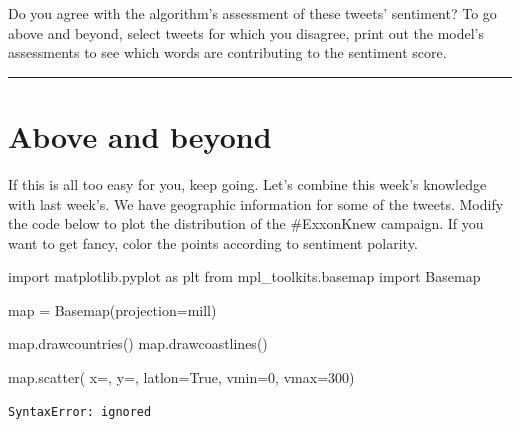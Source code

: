 \documentclass[
  letterpaper,
  DIV=11,
  numbers=noendperiod]{scrreprt}
\newenvironment{Shaded}{\begin{snugshade}}{\end{snugshade}}
\newcommand{\BuiltInTok}[1]{\textcolor[rgb]{0.00,0.23,0.31}{#1}}
\newcommand{\DecValTok}[1]{\textcolor[rgb]{0.68,0.00,0.00}{#1}}
\newcommand{\ImportTok}[1]{\textcolor[rgb]{0.00,0.46,0.62}{#1}}
\newcommand{\NormalTok}[1]{\textcolor[rgb]{0.00,0.23,0.31}{#1}}
\newcommand{\OperatorTok}[1]{\textcolor[rgb]{0.37,0.37,0.37}{#1}}
\newcommand{\StringTok}[1]{\textcolor[rgb]{0.13,0.47,0.30}{#1}}
\newcommand{\VariableTok}[1]{\textcolor[rgb]{0.07,0.07,0.07}{#1}}
\begin{document}
Do you agree with the algorithm's assessment of these tweets' sentiment?
To go above and beyond, select tweets for which you disagree, print out
the model's assessments to see which words are contributing to the
sentiment score.

\begin{center}\rule{0.5\linewidth}{0.5pt}\end{center}

\begin{Shaded}
\begin{Highlighting}[]

\end{Highlighting}
\end{Shaded}

\hypertarget{above-and-beyond}{%
\section{Above and beyond}\label{above-and-beyond}}

If this is all too easy for you, keep going. Let's combine this week's
knowledge with last week's. We have geographic information for some of
the tweets. Modify the code below to plot the distribution of the
\#ExxonKnew campaign. If you want to get fancy, color the points
according to sentiment polarity.

\begin{Shaded}
\begin{Highlighting}[]
\ImportTok{import}\NormalTok{ matplotlib.pyplot }\ImportTok{as}\NormalTok{ plt}
\ImportTok{from}\NormalTok{ mpl\_toolkits.basemap }\ImportTok{import}\NormalTok{ Basemap}

\BuiltInTok{map} \OperatorTok{=}\NormalTok{ Basemap(projection}\OperatorTok{=}\StringTok{\textquotesingle{}mill\textquotesingle{}}\NormalTok{)}

\BuiltInTok{map}\NormalTok{.drawcountries()}
\BuiltInTok{map}\NormalTok{.drawcoastlines()}

\BuiltInTok{map}\NormalTok{.scatter(}
\NormalTok{      x}\OperatorTok{=}\NormalTok{, }
\NormalTok{      y}\OperatorTok{=}\NormalTok{, }
\NormalTok{      latlon}\OperatorTok{=}\VariableTok{True}\NormalTok{, }
\NormalTok{      vmin}\OperatorTok{=}\DecValTok{0}\NormalTok{, }
\NormalTok{      vmax}\OperatorTok{=}\DecValTok{300}\NormalTok{)}
\end{Highlighting}
\end{Shaded}

\begin{verbatim}
SyntaxError: ignored
\end{verbatim}
\end{document}
